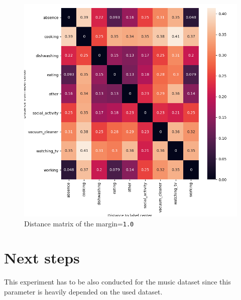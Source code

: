 \documentclass[twocolumn]{article}
\begin{document}
\begin{figure}[t]
\centering
    \includegraphics[width=\linewidth]{assets/distance_mat_margin_1.png}
    \caption{Distance matrix of the margin=\texttt{1.0}}
    \label{fig:dist-margin-1}
\end{figure}

\section{Next steps}
This experiment has to be also conducted for the music dataset since this parameter is heavily depended on the used dataset.
\end{document}
